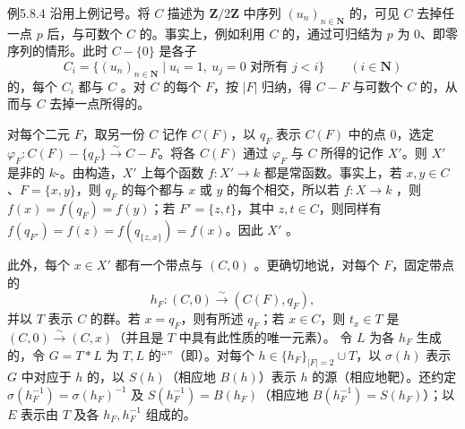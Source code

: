 \begin{SGAresult}{例}{5.8.4}
沿用上例记号。将 $C$ 描述为 $\mathbf Z/2\mathbf Z$ 中序列 $(u_n)_{n\in\mathbf N}$ 的，可见 $C$ 去掉任一点 $p$ 后，与可数个 $C$ 的。事实上，例如利用 $C$ 的，通过可归结为 $p$ 为 $0$、即零序列的情形。此时 $C-\{0\}$ 是各子
\[
C_i=\{(u_n)_{n\in\mathbf N}\mid u_i=1,\ u_j=0\text{ 对所有 }j<i\}\qquad(i\in\mathbf N)
\]
的，每个 $C_i$ 都与 $C$ 。对 $C$ 的每个 $F$，按 $|F|$ 归纳，得 $C-F$ 与可数个 $C$ 的，从而与 $C$ 去掉一点所得的。

对每个二元 $F$，取另一份 $C$ 记作 $C(F)$，以 $q_F$ 表示 $C(F)$ 中的点 $0$，选定 $\varphi_F:C(F)-\{q_F\}\xrightarrow{\sim}C-F$。将各 $C(F)$ 通过 $\varphi_F$ 与 $C$ 所得的记作 $X'$。则 $X'$ 是非的 $k$-。由构造，$X'$ 上每个函数 $f:X'\to k$ 都是常函数。事实上，若 $x,y\in C$、$F=\{x,y\}$，则 $q_F$ 的每个都与 $x$ 或 $y$ 的每个相交，所以若 $f:X\to k$ ，则 $f(x)=f(q_F)=f(y)$；若 $F'=\{z,t\}$，其中 $z,t\in C$，则同样有 $f(q_{F'})=f(z)=f(q_{\{z,x\}})=f(x)$。因此 $X'$ 。

此外，每个 $x\in X'$ 都有一个带点与 $(C,0)$ 。更确切地说，对每个 $F$，固定带点的
\[
h_F:(C,0)\xrightarrow{\sim}(C(F),q_F),
\]
并以 $T$ 表示 $C$ 的群。若 $x=q_F$，则有所述 $q_F$；若 $x\in C$，则 $t_x\in T$ 是 $(C,0)\xrightarrow{\sim}(C,x)$（并且是 $T$ 中具有此性质的唯一元素）。
令 $L$ 为各 $h_F$ 生成的，令 $G=T*L$ 为 $T,L$ 的“”（即）。对每个 $h\in\{h_F\}_{|F|=2}\cup T$，以 $\sigma(h)$ 表示 $G$ 中对应于 $h$ 的，以 $S(h)$（相应地 $B(h)$）表示 $h$ 的源（相应地靶）。还约定 $\sigma(h_F^{-1})=\sigma(h_F)^{-1}$ 及 $S(h_F^{-1})=B(h_F)$（相应地 $B(h_F^{-1})=S(h_F)$）；以 $E$ 表示由 $T$ 及各 $h_F,h_F^{-1}$ 组成的。


\end{SGAresult}
